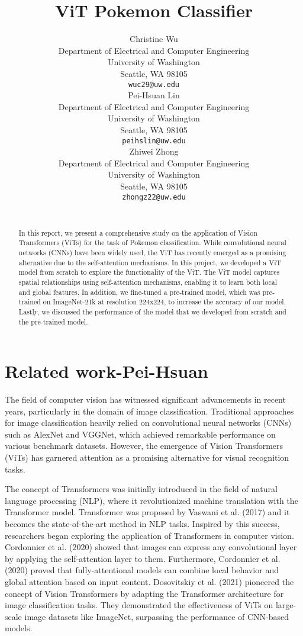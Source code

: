 \documentclass{article} %
\title{ViT Pokemon Classifier}
\author{
Christine Wu\\
Department of Electrical and Computer Engineering\\
University of Washington\\
Seattle, WA 98105 \\
\texttt{wuc29@uw.edu} \\
\And
Pei-Hsuan Lin \\
Department of Electrical and Computer Engineering\\
University of Washington\\
Seattle, WA 98105 \\
\texttt{peihslin@uw.edu} \\
\AND
Zhiwei Zhong \\
Department of Electrical and Computer Engineering\\
University of Washington\\
Seattle, WA 98105 \\
\texttt{zhongz22@uw.edu} \\
\\
}
\begin{document}
\maketitle

\begin{abstract}
In this report, we present a comprehensive study on the application of Vision Transformers 
(ViTs) for the task of Pokemon classification. While convolutional neural networks (CNNs) 
have been widely used, the ViT has recently emerged as a promising alternative due to the 
self-attention mechanisms. In this project, we developed a ViT model from scratch to explore
 the functionality of the ViT. The ViT model captures spatial relationships using 
 self-attention mechanisms, enabling it to learn both local and global features. 
 In addition, we fine-tuned a pre-trained model, which was pre-trained on ImageNet-21k at 
 resolution 224x224, to increase the accuracy of our model. Lastly, we discussed the 
 performance of the model that we developed from scratch and the pre-trained model.
\end{abstract}

\section{Related work-Pei-Hsuan}
The field of computer vision has witnessed significant advancements in recent years, 
particularly in the domain of image classification. Traditional approaches for image 
classification heavily relied on convolutional neural networks (CNNs) such as AlexNet 
and VGGNet, which achieved remarkable performance on various benchmark datasets. However, 
the emergence of Vision Transformers (ViTs) has garnered attention as a promising 
alternative for visual recognition tasks.

The concept of Transformers was initially introduced in the field of natural language 
processing (NLP), where it revolutionized machine translation with the Transformer model. 
Transformer was proposed by Vaswani et al. (2017) and it becomes the state-of-the-art 
method in NLP tasks. Inspired by this success, researchers began exploring the application 
of Transformers in computer vision. Cordonnier et al. (2020) showed that images can express 
any convolutional layer by applying the self-attention layer to them. Furthermore, 
Cordonnier et al. (2020) proved that fully-attentional models can combine local behavior 
and global attention based on input content. Dosovitskiy et al. (2021) pioneered the 
concept of Vision Transformers by adapting the Transformer architecture for image 
classification tasks. They demonstrated the effectiveness of ViTs on large-scale image 
datasets like ImageNet, surpassing the performance of CNN-based models.
\end{document}
